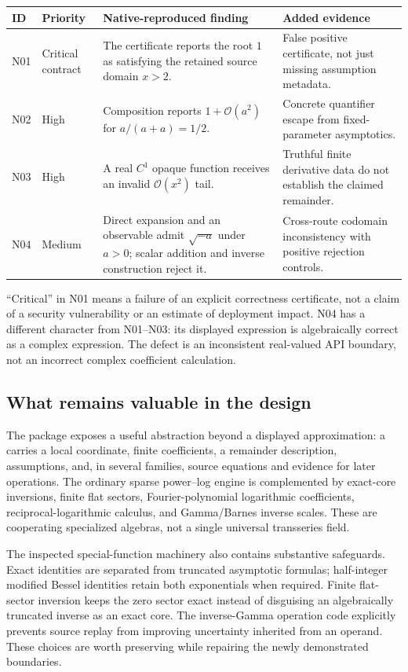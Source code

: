 \documentclass[11pt,letterpaper]{article}
\newcommand{\code}[1]{\texttt{\detokenize{#1}}}
\newcommand{\OO}{\mathcal O}
\begin{document}
\begin{longtable}{@{}P{0.075\textwidth}P{0.13\textwidth}P{0.49\textwidth}P{0.23\textwidth}@{}}
\toprule
ID & Priority & Native-reproduced finding & Added evidence\\
\midrule\endhead
N01 & Critical contract & The certificate reports the root $1$ as satisfying the retained source domain $x>2$. & False positive certificate, not just missing assumption metadata.\\
N02 & High & Composition reports $1+\OO(a^2)$ for $a/(a+a)=1/2$. & Concrete quantifier escape from fixed-parameter asymptotics.\\
N03 & High & A real $C^1$ opaque function receives an invalid $\OO(x^2)$ tail. & Truthful finite derivative data do not establish the claimed remainder.\\
N04 & Medium & Direct expansion and an observable admit $\sqrt{-a}$ under $a>0$; scalar addition and inverse construction reject it. & Cross-route codomain inconsistency with positive rejection controls.\\
\bottomrule
\end{longtable}

``Critical'' in N01 means a failure of an explicit correctness certificate, not a claim of a security vulnerability or an estimate of deployment impact. N04 has a different character from N01--N03: its displayed expression is algebraically correct as a complex expression. The defect is an inconsistent real-valued API boundary, not an incorrect complex coefficient calculation.

\subsection{What remains valuable in the design}
The package exposes a useful abstraction beyond a displayed approximation: a \code{GeneralizedSeries} carries a local coordinate, finite coefficients, a remainder description, assumptions, and, in several families, source equations and evidence for later operations. The ordinary sparse power--log engine is complemented by exact-core inversions, finite flat sectors, Fourier-polynomial logarithmic coefficients, reciprocal-logarithmic calculus, and Gamma/Barnes inverse scales. These are cooperating specialized algebras, not a single universal transseries field.\cite{readme,core,operations,flat,fourier,reciprocal,gammainverse,barnesinverse}

The inspected special-function machinery also contains substantive safeguards. Exact identities are separated from truncated asymptotic formulas; half-integer modified Bessel identities retain both exponentials when required. Finite flat-sector inversion keeps the zero sector exact instead of disguising an algebraically truncated inverse as an exact core. The inverse-Gamma operation code explicitly prevents source replay from improving uncertainty inherited from an operand. These choices are worth preserving while repairing the newly demonstrated boundaries.\cite{identities,flat,gammaops}
\end{document}
